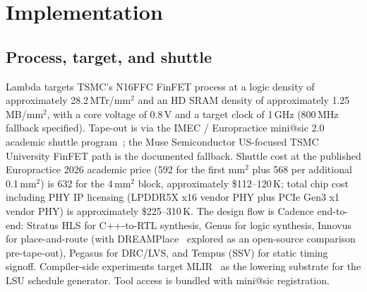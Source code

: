 \documentclass[conference]{IEEEtran}
\begin{document}
\section{Implementation}
\label{sec:implementation}

\subsection{Process, target, and shuttle}

Lambda targets TSMC's N16FFC FinFET process at a logic density of approximately 28.2\,MTr/mm$^2$ and an HD SRAM density of approximately 1.25\,MB/mm$^2$, with a core voltage of 0.8\,V and a target clock of 1\,GHz (800\,MHz fallback specified). Tape-out is via the IMEC / Europractice mini@sic 2.0 academic shuttle program~\cite{imec_minisic}; the Muse Semiconductor US-focused TSMC University FinFET path is the documented fallback. Shuttle cost at the published Europractice 2026 academic price (592 for the first mm$^2$ plus 568 per additional 0.1\,mm$^2$) is 632 for the 4\,mm$^2$ block, approximately \$112--120\,K; total chip cost including PHY IP licensing (LPDDR5X x16 vendor PHY plus PCIe Gen3 x1 vendor PHY) is approximately \$225--310\,K. The design flow is Cadence end-to-end: Stratus HLS for C++-to-RTL synthesis, Genus for logic synthesis, Innovus for place-and-route (with DREAMPlace~\cite{dreamplace} explored as an open-source comparison pre-tape-out), Pegasus for DRC/LVS, and Tempus (SSV) for static timing signoff. Compiler-side experiments target MLIR~\cite{mlir} as the lowering substrate for the LSU schedule generator. Tool access is bundled with mini@sic registration.
\end{document}
